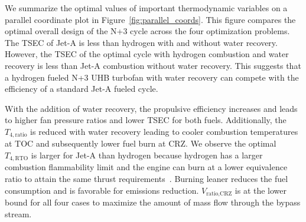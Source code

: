 \documentclass[conf]{new-aiaa}
\begin{document}
We summarize the optimal values of important thermodynamic variables on a parallel coordinate plot in Figure~\ref{fig:parallel_coords}.
This figure compares the optimal overall design of the N+3 cycle across the four optimization problems.
The TSEC of Jet-A is less than hydrogen with and without water recovery.
However, the TSEC of the optimal cycle with hydrogen combustion and water recovery is less than Jet-A combustion without water recovery.
This suggests that a hydrogen fueled N+3 UHB turbofan with water recovery can compete with the efficiency of a standard Jet-A fueled cycle.

With the addition of water recovery, the propulsive efficiency increases and leads to higher fan pressure ratios and lower TSEC for both fuels.
Additionally, the $T_{4,\text{ratio}}$ is reduced with water recovery leading to cooler combustion temperatures at TOC and subsequently lower fuel burn at CRZ.
We observe the optimal $T_{4,\text{RTO}}$ is larger for Jet-A than hydrogen because hydrogen has a larger combustion flammability limit and the engine can burn at a lower equivalence ratio to attain the same thrust requirements~\cite{Adler2023}.
Burning leaner reduces the fuel consumption and is favorable for emissions reduction.
$V_\text{ratio,CRZ}$ is at the lower bound for all four cases to maximize the amount of mass flow through the bypass stream.
\end{document}
